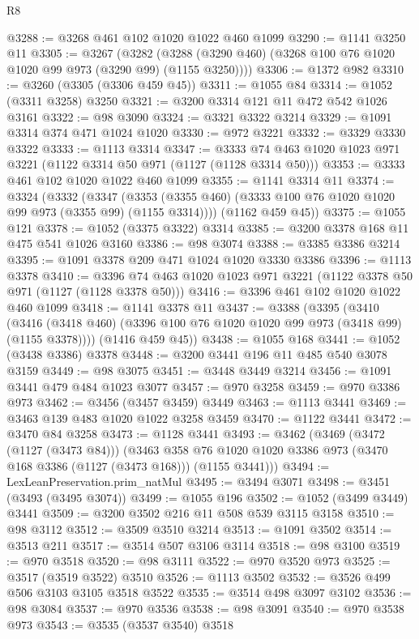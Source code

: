 \begin{lexlean}{R8}
\begin{coremodule}
@3288 := @3268 @461 @102 @1020 @1022 @460 @1099
@3290 := @1141 @3250 @11
@3305 := @3267
    (@3282 (@3288 (@3290 @460) (@3268 @100 @76 @1020 @1020 @99 @973 (@3290 @99) (@1155 @3250))))
@3306 := @1372 @982
@3310 := @3260 (@3305 (@3306 @459 @45))
@3311 := @1055 @84
@3314 := @1052 (@3311 @3258) @3250
@3321 := @3200 @3314 @121 @11 @472 @542 @1026 @3161
@3322 := @98 @3090
@3324 := @3321 @3322 @3214
@3329 := @1091 @3314 @374 @471 @1024 @1020
@3330 := @972 @3221
@3332 := @3329 @3330 @3322
@3333 := @1113 @3314
@3347 := @3333 @74 @463 @1020 @1023 @971 @3221 (@1122 @3314 @50 @971 (@1127 (@1128 @3314 @50)))
@3353 := @3333 @461 @102 @1020 @1022 @460 @1099
@3355 := @1141 @3314 @11
@3374 := @3324
    (@3332
      (@3347 (@3353 (@3355 @460) (@3333 @100 @76 @1020 @1020 @99 @973 (@3355 @99) (@1155 @3314))))
      (@1162 @459 @45))
@3375 := @1055 @121
@3378 := @1052 (@3375 @3322) @3314
@3385 := @3200 @3378 @168 @11 @475 @541 @1026 @3160
@3386 := @98 @3074
@3388 := @3385 @3386 @3214
@3395 := @1091 @3378 @209 @471 @1024 @1020 @3330 @3386
@3396 := @1113 @3378
@3410 := @3396 @74 @463 @1020 @1023 @971 @3221 (@1122 @3378 @50 @971 (@1127 (@1128 @3378 @50)))
@3416 := @3396 @461 @102 @1020 @1022 @460 @1099
@3418 := @1141 @3378 @11
@3437 := @3388
    (@3395
      (@3410 (@3416 (@3418 @460) (@3396 @100 @76 @1020 @1020 @99 @973 (@3418 @99) (@1155 @3378))))
      (@1416 @459 @45))
@3438 := @1055 @168
@3441 := @1052 (@3438 @3386) @3378
@3448 := @3200 @3441 @196 @11 @485 @540 @3078 @3159
@3449 := @98 @3075
@3451 := @3448 @3449 @3214
@3456 := @1091 @3441 @479 @484 @1023 @3077
@3457 := @970 @3258
@3459 := @970 @3386 @973
@3462 := @3456 (@3457 @3459) @3449
@3463 := @1113 @3441
@3469 := @3463 @139 @483 @1020 @1022 @3258 @3459
@3470 := @1122 @3441
@3472 := @3470 @84 @3258
@3473 := @1128 @3441
@3493 := @3462
    (@3469
      (@3472 (@1127 (@3473 @84)))
      (@3463 @358 @76 @1020 @1020 @3386 @973 (@3470 @168 @3386 (@1127 (@3473 @168))) (@1155 @3441)))
@3494 := LexLeanPreservation.prim_natMul
@3495 := @3494 @3071
@3498 := @3451 (@3493 (@3495 @3074))
@3499 := @1055 @196
@3502 := @1052 (@3499 @3449) @3441
@3509 := @3200 @3502 @216 @11 @508 @539 @3115 @3158
@3510 := @98 @3112
@3512 := @3509 @3510 @3214
@3513 := @1091 @3502
@3514 := @3513 @211
@3517 := @3514 @507 @3106 @3114
@3518 := @98 @3100
@3519 := @970 @3518
@3520 := @98 @3111
@3522 := @970 @3520 @973
@3525 := @3517 (@3519 @3522) @3510
@3526 := @1113 @3502
@3532 := @3526 @499 @506 @3103 @3105 @3518 @3522
@3535 := @3514 @498 @3097 @3102
@3536 := @98 @3084
@3537 := @970 @3536
@3538 := @98 @3091
@3540 := @970 @3538 @973
@3543 := @3535 (@3537 @3540) @3518

\end{coremodule}
\end{lexlean}
